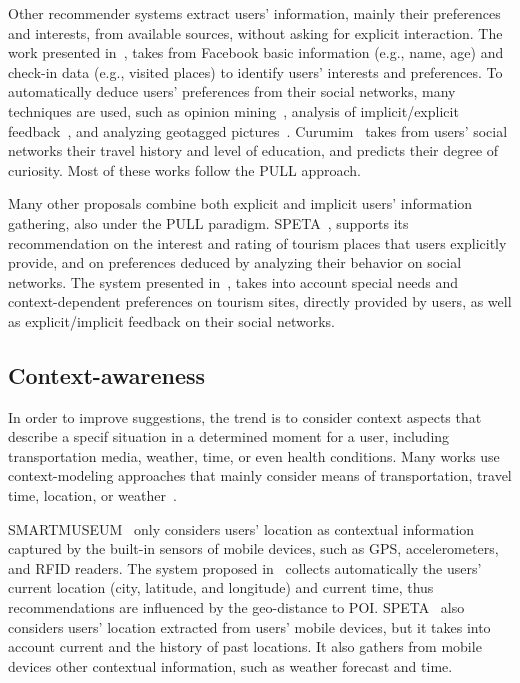Other recommender systems extract users' information, mainly their preferences and interests, from available sources,
without asking for explicit interaction.  The work presented in~\cite{kesorn2017personalized}, takes from Facebook basic information (e.g., name, age) and  check-in data (e.g., visited places)  to identify users' interests and preferences. 
To automatically deduce users' preferences from their social networks, many techniques are used, such as opinion mining~\cite{logesh2019exploring,logesh2018personalised}, analysis of implicit/explicit feedback~\cite{hidasi2016general}, and analyzing geotagged pictures~\cite{sun2019building}. 
Curumim~\cite{menk2017curumim} takes from users' social networks their travel history and level of education, and predicts their degree of curiosity. Most of these works follow the PULL approach.


Many other proposals combine both explicit and implicit users' information gathering, also under the PULL paradigm. SPETA~\cite{garcia2009speta},  supports  its recommendation on the interest and rating  of tourism places that users explicitly provide, and on preferences deduced by analyzing their behavior on social networks. The system presented in~\cite{alonso2012ontology}, takes into account special needs and  context-dependent preferences on tourism sites, directly  provided by users, as well as explicit/implicit feedback on their social networks. 

\vspace{-0.4cm}
\subsection{Context-awareness}
In order to improve suggestions, the trend is to consider context aspects that describe a specif situation in a determined moment for a user, including transportation media, weather, time, or even health conditions. Many works use context-modeling approaches that mainly consider means of transportation, travel time,  location, or weather~\cite{rajaonarivo2019rec,bahramian_abbaspour_claramunt_2017,arigi2018context,kesorn2017personalized,logesh2019exploring,logesh2018personalised}.


SMARTMUSEUM~\cite{ruotsalo2013smartmuseum} only considers users' location as contextual information captured by the built-in sensors of mobile devices, such as GPS, accelerometers, and RFID readers. The system proposed in~\cite{shen2016attraction} collects automatically the users' current location (city, latitude, and longitude) and current time, thus recommendations are influenced by the geo-distance to POI. SPETA~\cite{garcia2009speta} also considers users' location extracted from users' mobile devices, but it takes into account current and the history of past locations. It also gathers from  mobile devices other contextual information, such as weather forecast and time. 


